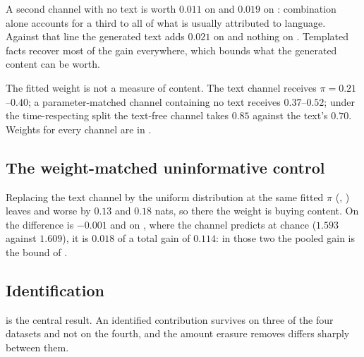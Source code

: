 A second channel with no text is worth $0.011$ on  and $0.019$ on
: combination alone accounts for a third to all of what is usually attributed
to language. Against that line the generated text adds $0.021$ on  and nothing
on . Templated facts recover most of the gain everywhere, which bounds what
the generated content can be worth.

The fitted weight is not a measure of content. The text channel receives $\pi = 0.21$--$0.40$;
a parameter-matched channel containing no text receives $0.37$--$0.52$; under the
time-respecting split the text-free channel takes $0.85$ against the text's $0.70$. Weights
for every channel are in .

\subsection{The weight-matched uninformative control}

Replacing the text channel by the uniform distribution at the same fitted $\pi$
(, ) leaves  and  worse by $0.13$
and $0.18$ nats, so there the weight is buying content. On  the difference
is $-0.001$ and on , where the channel predicts at chance ($1.593$ against
$1.609$), it is $0.018$ of a total gain of $0.114$: in those two the pooled gain is the bound
of .

\subsection{Identification}

\begin{table}[t]
\caption{Each variant against its own shuffled control, respondent-disjoint protocol, weight
fitted out of fold. The control shuffles the same processed embeddings, so the difference
isolates content specific to the event. Erasure removes every direction linearly predictable
from the attributes, the alternative identity and the covariates.}
\label{tab:identification}
\centering\small

\end{table}

 is the central result. An identified contribution survives on three
of the four datasets and not on the fourth, and the amount erasure removes differs sharply
between them.

